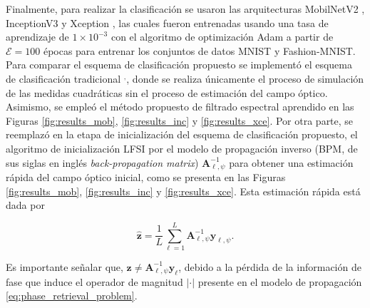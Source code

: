 Finalmente, para realizar la clasificación se usaron las arquitecturas MobilNetV2 , InceptionV3  y Xception , las cuales fueron entrenadas usando una tasa de aprendizaje de $1\times 10^{-3}$ con el algoritmo de optimización Adam a partir de $\mathcal{E}=100$ épocas para entrenar los conjuntos de datos MNIST y Fashion-MNIST. Para comparar el esquema de clasificación propuesto se implementó el esquema de clasificación tradicional $^,$, donde se realiza únicamente el proceso de simulación de las medidas cuadráticas sin el proceso de estimación del campo óptico. Asimismo, se empleó el método propuesto de filtrado espectral aprendido en las Figuras \ref{fig:results_mob}, \ref{fig:results_inc} y \ref{fig:results_xce}. Por otra parte, se reemplazó en la etapa de inicialización del esquema de clasificación propuesto, el algoritmo de inicialización LFSI por el modelo de propagación inverso (BPM, de sus siglas en inglés \textit{back-propagation matrix}) $\mathbf{A}_{\ell, \psi}^{-1}$ para obtener una estimación rápida del campo óptico inicial, como se presenta en las Figuras \ref{fig:results_mob}, \ref{fig:results_inc} y  \ref{fig:results_xce}. Esta estimación rápida está dada por 

\begin{equation}
    \hat{\mathbf{z}}= \frac{1}{L}\sum_{\ell=1}^{ L} \mathbf{A}_{\ell, \psi}^{-1}\mathbf{y}_{\ell, \psi}
    \label{eq:back_propagation}.
\end{equation}

Es importante señalar que, $\mathbf{z} \neq \mathbf{A}_{\ell, \psi}^{-1}\mathbf{y}_{\ell}$, debido a la pérdida de la información de fase que induce el operador de magnitud $\vert \cdot \vert$ presente en el modelo de propagación \eqref{eq:phase_retrieval_problem}.



